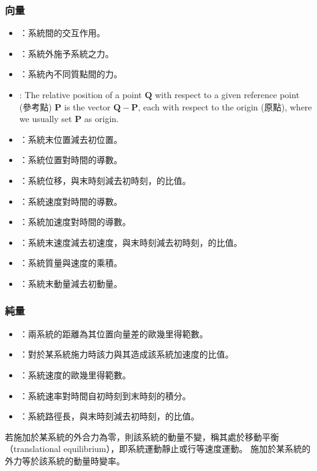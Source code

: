 \documentclass[a4paper,12pt]{article}
\begin{document}
\subsubsection{向量}
\begin{itemize}
\item{}：系統間的交互作用。
\item{}：系統外施予系統之力。
\item{}：系統內不同質點間的力。
\item{}: The relative position of a point $\mathbf{Q}$ with respect to a given reference point (參考點) $\mathbf{P}$ is the vector $\mathbf{Q}-\mathbf{P}$, each with respect to the origin (原點), where we usually set $\mathbf{P}$ as origin.
\item{}：系統末位置減去初位置。
\item{}：系統位置對時間的導數。
\item{}：系統位移，與末時刻減去初時刻，的比值。
\item{}：系統速度對時間的導數。
\item{}：系統加速度對時間的導數。
\item{}：系統末速度減去初速度，與末時刻減去初時刻，的比值。
\item{}：系統質量與速度的乘積。
\item{}：系統末動量減去初動量。
\end{itemize}
\subsubsection{純量}
\begin{itemize}
\item{}：兩系統的距離為其位置向量差的歐幾里得範數。
\item{}：對於某系統施力時該力與其造成該系統加速度的比值。
\item{}：系統速度的歐幾里得範數。
\item{}：系統速率對時間自初時刻到末時刻的積分。
\item{}：系統路徑長，與末時刻減去初時刻，的比值。
\end{itemize}
若施加於某系統的外合力為零，則該系統的動量不變，稱其處於移動平衡（translational equilibrium），即系統運動靜止或行等速度運動。
施加於某系統的外力等於該系統的動量時變率。
\end{document}
